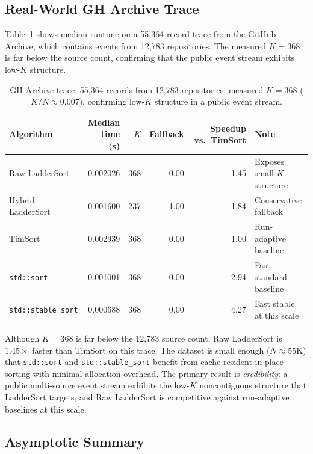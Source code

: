 \documentclass{ieeeaccess}
\theoremstyle{plain}
\theoremstyle{definition}
\begin{document}
\subsection{Real-World GH Archive Trace}
\label{sec:gharchive}

Table~\ref{tab:phase6-real-trace} shows median runtime on a 55,364-record trace from the GitHub Archive, which contains events from 12,783 repositories. The measured $K=368$ is far below the source count, confirming that the public event stream exhibits low-$K$ structure.

\begin{table}[t]
\centering\small
\caption{GH Archive trace: 55,364 records from 12,783 repositories, measured
  $K=368$ ($K/N \approx 0.007$), confirming low-$K$ structure in a public
  event stream.}
\label{tab:phase6-real-trace}
\begin{tabularx}{\linewidth}{@{}lrrrrX@{}}
\toprule
Algorithm & Median time (s) & $K$ & Fallback & Speedup vs.\ TimSort & Note \\
\midrule
Raw LadderSort    & 0.002026 & 368 & 0.00 & 1.45 & Exposes small-$K$ structure \\
Hybrid LadderSort & 0.001600 & 237 & 1.00 & 1.84 & Conservative fallback \\
TimSort           & 0.002939 & 368 & 0.00 & 1.00 & Run-adaptive baseline \\
\texttt{std::sort}       & 0.001001 & 368 & 0.00 & 2.94 & Fast standard baseline \\
\texttt{std::stable\_sort} & 0.000688 & 368 & 0.00 & 4.27 & Fast stable at this scale \\
\bottomrule
\end{tabularx}
\end{table}

Although $K=368$ is far below the 12,783 source count, Raw LadderSort is $1.45\times$ faster than TimSort on this trace.  The dataset is small enough ($N \approx 55$K) that \texttt{std::sort} and \texttt{std::stable\_sort} benefit from cache-resident in-place sorting with minimal allocation overhead. The primary result is \emph{credibility}: a public multi-source event stream exhibits the low-$K$ noncontiguous structure that LadderSort targets, and Raw LadderSort is competitive against run-adaptive baselines at this scale.

\subsection{Asymptotic Summary}
\end{document}
